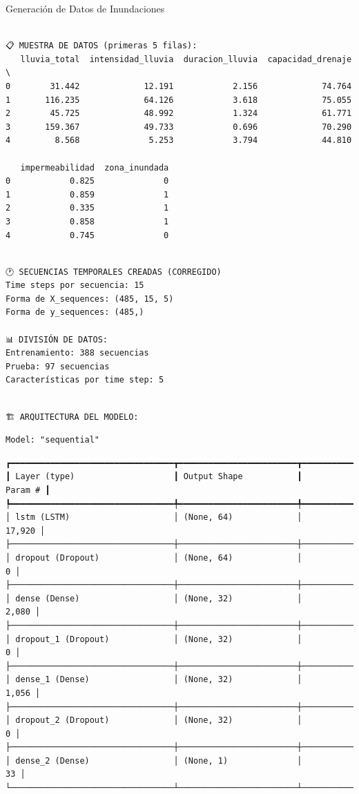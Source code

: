\documentclass[
  ignorenonframetext,
]{beamer}
\begin{document}
\begin{frame}[fragile]{Generación de Datos de Inundaciones}
\begin{verbatim}

📋 MUESTRA DE DATOS (primeras 5 filas):
   lluvia_total  intensidad_lluvia  duracion_lluvia  capacidad_drenaje  \
0        31.442             12.191            2.156             74.764   
1       116.235             64.126            3.618             75.055   
2        45.725             48.992            1.324             61.771   
3       159.367             49.733            0.696             70.290   
4         8.568              5.253            3.794             44.810   

   impermeabilidad  zona_inundada  
0            0.825              0  
1            0.859              1  
2            0.335              1  
3            0.858              1  
4            0.745              0  
\end{verbatim}

\begin{verbatim}

🕐 SECUENCIAS TEMPORALES CREADAS (CORREGIDO)
Time steps por secuencia: 15
Forma de X_sequences: (485, 15, 5)
Forma de y_sequences: (485,)

📊 DIVISIÓN DE DATOS:
Entrenamiento: 388 secuencias
Prueba: 97 secuencias
Características por time step: 5
\end{verbatim}

\begin{verbatim}

🏗️ ARQUITECTURA DEL MODELO:
\end{verbatim}

\begin{verbatim}
Model: "sequential"
\end{verbatim}

\begin{verbatim}
┏━━━━━━━━━━━━━━━━━━━━━━━━━━━━━━━━━┳━━━━━━━━━━━━━━━━━━━━━━━━┳━━━━━━━━━━━━━━━┓
┃ Layer (type)                    ┃ Output Shape           ┃       Param # ┃
┡━━━━━━━━━━━━━━━━━━━━━━━━━━━━━━━━━╇━━━━━━━━━━━━━━━━━━━━━━━━╇━━━━━━━━━━━━━━━┩
│ lstm (LSTM)                     │ (None, 64)             │        17,920 │
├─────────────────────────────────┼────────────────────────┼───────────────┤
│ dropout (Dropout)               │ (None, 64)             │             0 │
├─────────────────────────────────┼────────────────────────┼───────────────┤
│ dense (Dense)                   │ (None, 32)             │         2,080 │
├─────────────────────────────────┼────────────────────────┼───────────────┤
│ dropout_1 (Dropout)             │ (None, 32)             │             0 │
├─────────────────────────────────┼────────────────────────┼───────────────┤
│ dense_1 (Dense)                 │ (None, 32)             │         1,056 │
├─────────────────────────────────┼────────────────────────┼───────────────┤
│ dropout_2 (Dropout)             │ (None, 32)             │             0 │
├─────────────────────────────────┼────────────────────────┼───────────────┤
│ dense_2 (Dense)                 │ (None, 1)              │            33 │
└─────────────────────────────────┴────────────────────────┴───────────────┘
\end{verbatim}


\end{frame}
\end{document}
